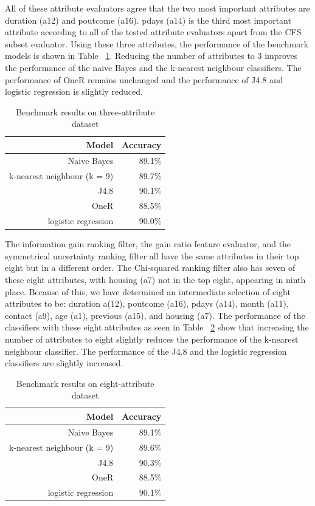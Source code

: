 \documentclass[a4paper,11pt]{article}
\begin{document}
All of these attribute evaluators agree that the two most important attributes are duration (a12) and poutcome (a16).
pdays (a14) is the third most important attribute according to all of the tested attribute evaluators apart from
the CFS subset evaluator. Using these three attributes, the performance of the benchmark models is shown in Table
~\ref{tab:topThreeBenchmark}. Reducing the number of attributes to 3 improves the performance of the naive Bayes
and the k-nearest neighbour classifiers. The performance of OneR remains unchanged and the performance of J4.8
and logistic regression is slightly reduced. 

\begin{table}[H]
  \begin{center}
    \begin{tabular}{r | r}
      Model & Accuracy  \\ \hline
      Naive Bayes & 89.1\% \\
      k-nearest neighbour (k = 9) & 89.7\% \\
      J4.8 & 90.1\% \\
      OneR & 88.5\% \\
      logistic regression & 90.0\% \\
    \end{tabular}
  \end{center}
  \caption{Benchmark results on three-attribute dataset}
  \label{tab:topThreeBenchmark}
\end{table}

The information gain ranking filter, the gain ratio feature evaluator, and the symmetrical uncertainty ranking
filter all have the same attributes in their top eight but in a different order. The Chi-squared ranking filter
also has seven of these eight attributes, with housing (a7) not in the top eight, appearing in ninth place.
Because of this, we have determined an intermediate selection of eight attributes to be: 
duration a(12), poutcome (a16), pdays (a14), month (a11), contact (a9), age (a1), previous (a15), and housing (a7).
The performance of the classifiers with these eight attributes as seen in Table ~\ref{tab:topEightBenchmark} show
that increasing the number of attributes to eight slightly reduces the performance of the k-nearest neighbour
classifier. The performance of the J4.8 and the logistic regression classifiers are slightly increased. 

\begin{table}[H]
  \begin{center}
    \begin{tabular}{r | r}
      Model & Accuracy  \\ \hline
      Naive Bayes & 89.1\% \\
      k-nearest neighbour (k = 9) & 89.6\% \\
      J4.8 & 90.3\% \\
      OneR & 88.5\% \\
      logistic regression & 90.1\% \\
    \end{tabular}
  \end{center}
  \caption{Benchmark results on eight-attribute dataset}
  \label{tab:topEightBenchmark}
\end{table}
\end{document}
